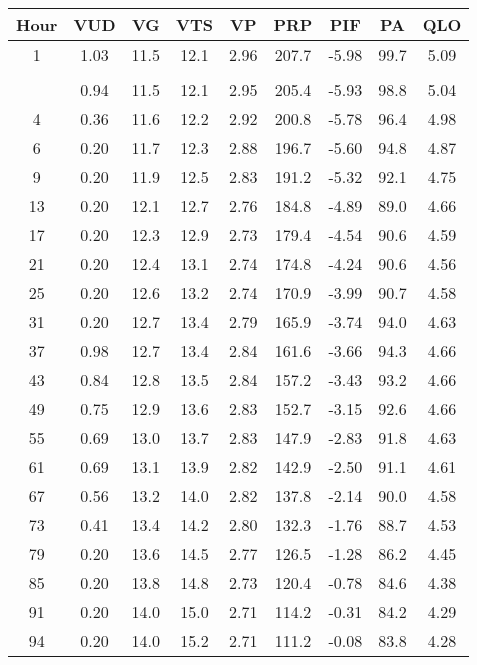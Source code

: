 \begin{table}
  \centering
  \begin{tabular}{ccccccccc}
    \toprule
    Hour & VUD & VG & VTS & VP & PRP & PIF & PA & QLO \\
    \midrule
    1 & 1.03 & 11.5 & 12.1 & 2.96 & 207.7 & -5.98 & 99.7 & 5.09 \\
    \addlinespace[\paramchangeskip]
    \multicolumn{9}{c}{\textit{DPO = 0.050}} \\
    \addlinespace[\paramchangeskip]
    2 & 0.94 & 11.5 & 12.1 & 2.95 & 205.4 & -5.93 & 98.8 & 5.04 \\
    4 & 0.36 & 11.6 & 12.2 & 2.92 & 200.8 & -5.78 & 96.4 & 4.98 \\
    6 & 0.20 & 11.7 & 12.3 & 2.88 & 196.7 & -5.60 & 94.8 & 4.87 \\
    9 & 0.20 & 11.9 & 12.5 & 2.83 & 191.2 & -5.32 & 92.1 & 4.75 \\
    13 & 0.20 & 12.1 & 12.7 & 2.76 & 184.8 & -4.89 & 89.0 & 4.66 \\
    17 & 0.20 & 12.3 & 12.9 & 2.73 & 179.4 & -4.54 & 90.6 & 4.59 \\
    21 & 0.20 & 12.4 & 13.1 & 2.74 & 174.8 & -4.24 & 90.6 & 4.56 \\
    25 & 0.20 & 12.6 & 13.2 & 2.74 & 170.9 & -3.99 & 90.7 & 4.58 \\
    31 & 0.20 & 12.7 & 13.4 & 2.79 & 165.9 & -3.74 & 94.0 & 4.63 \\
    37 & 0.98 & 12.7 & 13.4 & 2.84 & 161.6 & -3.66 & 94.3 & 4.66 \\
    43 & 0.84 & 12.8 & 13.5 & 2.84 & 157.2 & -3.43 & 93.2 & 4.66 \\
    49 & 0.75 & 12.9 & 13.6 & 2.83 & 152.7 & -3.15 & 92.6 & 4.66 \\
    55 & 0.69 & 13.0 & 13.7 & 2.83 & 147.9 & -2.83 & 91.8 & 4.63 \\
    61 & 0.69 & 13.1 & 13.9 & 2.82 & 142.9 & -2.50 & 91.1 & 4.61 \\
    67 & 0.56 & 13.2 & 14.0 & 2.82 & 137.8 & -2.14 & 90.0 & 4.58 \\
    73 & 0.41 & 13.4 & 14.2 & 2.80 & 132.3 & -1.76 & 88.7 & 4.53 \\
    79 & 0.20 & 13.6 & 14.5 & 2.77 & 126.5 & -1.28 & 86.2 & 4.45 \\
    85 & 0.20 & 13.8 & 14.8 & 2.73 & 120.4 & -0.78 & 84.6 & 4.38 \\
    91 & 0.20 & 14.0 & 15.0 & 2.71 & 114.2 & -0.31 & 84.2 & 4.29 \\
    94 & 0.20 & 14.0 & 15.2 & 2.71 & 111.2 & -0.08 & 83.8 & 4.28 \\

\end{tabular}
\end{table}
